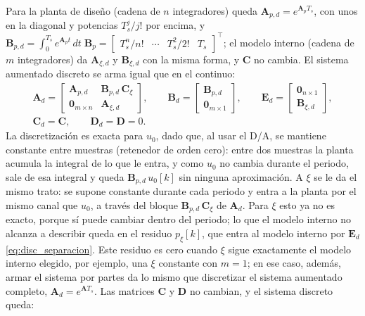 Para la planta de diseño (cadena de $n$ integradores) queda $\mathbf{A}_{p,d} = e^{\mathbf{A}_p T_s}$,
con unos en la diagonal y potencias $T_s^{j}/j!$ por encima, y
$\mathbf{B}_{p,d} = \int_0^{T_s} e^{\mathbf{A}_p t}\,dt\;\mathbf{B}_p = \begin{bmatrix} T_s^{n}/n! & \cdots & T_s^{2}/2! & T_s \end{bmatrix}^{\top}$;
el modelo interno (cadena de $m$ integradores) da $\mathbf{A}_{\xi,d}$ y $\mathbf{B}_{\xi,d}$ con la misma forma,
y $\mathbf{C}$ no cambia.
El sistema aumentado discreto se arma igual que en el continuo:
\begin{equation}
\begin{gathered}
\mathbf{A}_d =
\begin{bmatrix} \mathbf{A}_{p,d} & \mathbf{B}_{p,d}\,\mathbf{C}_{\xi} \\ \mathbf{0}_{m \times n} & \mathbf{A}_{\xi,d} \end{bmatrix},
\qquad
\mathbf{B}_d = \begin{bmatrix} \mathbf{B}_{p,d} \\ \mathbf{0}_{m \times 1} \end{bmatrix},
\qquad
\mathbf{E}_d = \begin{bmatrix} \mathbf{0}_{n \times 1} \\ \mathbf{B}_{\xi,d} \end{bmatrix},
\\[6pt]
\mathbf{C}_d = \mathbf{C}, \qquad \mathbf{D}_d = \mathbf{D} = 0 .
\end{gathered}
\label{eq:disc_armado}
\end{equation}
La discretización es exacta para $u_0$, dado que, al usar el D/A, se mantiene constante
entre muestras (retenedor de orden cero): entre dos muestras la planta acumula la integral
de lo que le entra, y como $u_0$ no cambia durante el periodo, sale de esa integral y queda
$\mathbf{B}_{p,d}\,u_0[k]$ sin ninguna aproximación. A $\xi$ se le da el mismo trato: se
supone constante durante cada periodo y entra a la planta por el mismo canal que $u_0$, a
través del bloque $\mathbf{B}_{p,d}\,\mathbf{C}_{\xi}$ de $\mathbf{A}_d$. Para $\xi$ esto ya
no es exacto, porque sí puede cambiar dentro del periodo; lo que el modelo interno no
alcanza a describir queda en el residuo $p_{\xi}[k]$, que entra al modelo interno por
$\mathbf{E}_d$ \eqref{eq:disc_separacion}. Este residuo es cero cuando $\xi$ sigue
exactamente el modelo interno elegido, por ejemplo, una $\xi$ constante con $m = 1$; en ese
caso, además, armar el sistema por partes da lo mismo que discretizar el sistema aumentado
completo, $\mathbf{A}_d = e^{\mathbf{A}T_s}$. Las matrices $\mathbf{C}$ y $\mathbf{D}$ no
cambian, y el sistema discreto queda:


